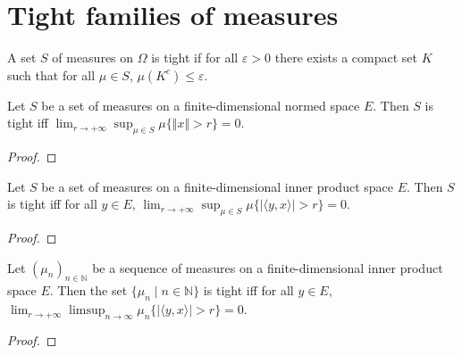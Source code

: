 \chapter{Tight families of measures}

\begin{definition}\label{def:tight}
 \mathlibok
A set $S$ of measures on $\Omega$ is tight if for all $\varepsilon > 0$ there exists a compact set $K$ such that for all $\mu \in S$, $\mu(K^c) \le \varepsilon$.
\end{definition}


\begin{lemma}\label{lem:isTightMeasureSet_iff_norm}
\mathlibok
{}
Let $S$ be a set of measures on a finite-dimensional normed space $E$. 
Then $S$ is tight iff $\lim_{r \to +\infty}\sup_{\mu \in S} \mu\{\Vert x \Vert > r\} = 0$.
\end{lemma}

\begin{proof}\leanok

\end{proof}
	

\begin{lemma}\label{lem:isTightMeasureSet_iff_sup_inner}
\leanok
{}
Let $S$ be a set of measures on a finite-dimensional inner product space $E$.
Then $S$ is tight iff for all $y \in E$, $\lim_{r \to +\infty}\sup_{\mu \in S} \mu\{\vert\langle y, x\rangle\vert > r\} = 0$.
\end{lemma}

\begin{proof}\leanok
{}
\end{proof}


\begin{lemma}\label{lem:isTightMeasureSet_iff_basis}
\leanok
{}
Let $(\mu_n)_{n \in \mathbb{N}}$ be a sequence of measures on a finite-dimensional inner product space $E$. 
Then the set $\{\mu_n \mid n \in \mathbb{N}\}$ is tight iff for all $y \in E$, $\lim_{r \to +\infty}\limsup_{n \to \infty} \mu_n\{\vert\langle y, x\rangle\vert > r\} = 0$.
\end{lemma}

\begin{proof}\leanok
{}
\end{proof}


